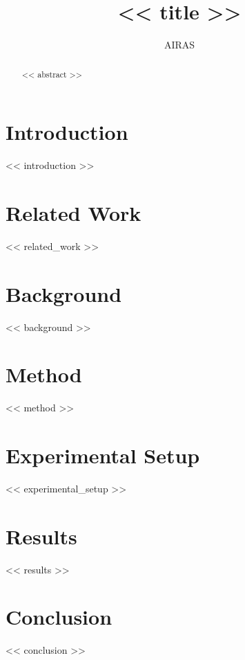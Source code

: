 \documentclass{article}
\title{<< title >>}
\author{AIRAS}
\begin{document}
\maketitle

\begin{abstract}
<< abstract >>
\end{abstract}



\section{Introduction}
<< introduction >>

\section{Related Work}
<< related_work >>

\section{Background}
<< background >>

\section{Method}
<< method >>

\section{Experimental Setup}
<< experimental_setup >>

\section{Results}
<< results >>

\section{Conclusion}
<< conclusion >>




\end{document}
